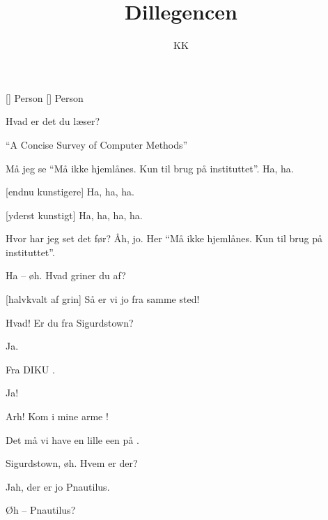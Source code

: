 \documentclass[a4paper,11pt]{article}
\title{Dillegencen}
\author{KK}
\begin{document}
\maketitle

\begin{roles}
[] Person
[] Person
\end{roles}

\begin{sketch}


 Hvad er det du læser?

 "`A Concise Survey of Computer Methods"'


 Må jeg se  "`Må ikke hjemlånes.  Kun til brug på instituttet"'.  Ha, ha.

[endnu kunstigere] Ha, ha, ha.

[yderst kunstigt] Ha, ha, ha, ha.

 Hvor har jeg set det før?  Åh, jo.  Her  "`Må ikke hjemlånes.  Kun til brug på instituttet"'.


 Ha -- øh.  Hvad griner du af?

[halvkvalt af grin] Så er vi jo fra samme sted!

 Hvad!  Er du fra Sigurdstown?

 Ja.

 Fra DIKU .

 Ja!

 Arh!  Kom i mine arme !

 Det må vi have en lille een på .

 Sigurdstown, øh.  Hvem er der?

 Jah, der er jo Pnautilus.

 Øh -- Pnautilus?


\end{sketch}
\end{document}
